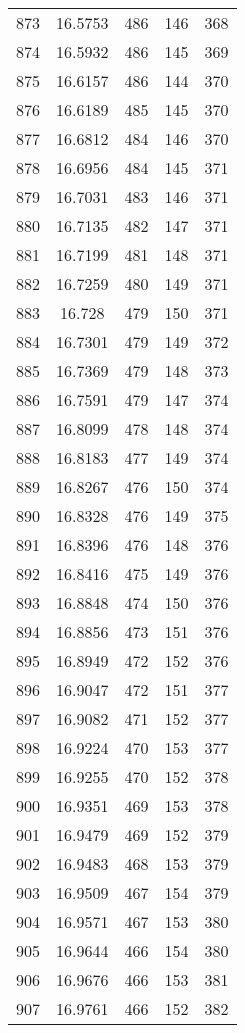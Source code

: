 \documentclass[12pt,a4paper]{article}
\begin{document}
\begin{tabular}{r|cccc}
	873 & 16.5753 & 486 & 146 & 368 \\
	874 & 16.5932 & 486 & 145 & 369 \\
	875 & 16.6157 & 486 & 144 & 370 \\
	876 & 16.6189 & 485 & 145 & 370 \\
	877 & 16.6812 & 484 & 146 & 370 \\
	878 & 16.6956 & 484 & 145 & 371 \\
	879 & 16.7031 & 483 & 146 & 371 \\
	880 & 16.7135 & 482 & 147 & 371 \\
	881 & 16.7199 & 481 & 148 & 371 \\
	882 & 16.7259 & 480 & 149 & 371 \\
	883 & 16.728 & 479 & 150 & 371 \\
	884 & 16.7301 & 479 & 149 & 372 \\
	885 & 16.7369 & 479 & 148 & 373 \\
	886 & 16.7591 & 479 & 147 & 374 \\
	887 & 16.8099 & 478 & 148 & 374 \\
	888 & 16.8183 & 477 & 149 & 374 \\
	889 & 16.8267 & 476 & 150 & 374 \\
	890 & 16.8328 & 476 & 149 & 375 \\
	891 & 16.8396 & 476 & 148 & 376 \\
	892 & 16.8416 & 475 & 149 & 376 \\
	893 & 16.8848 & 474 & 150 & 376 \\
	894 & 16.8856 & 473 & 151 & 376 \\
	895 & 16.8949 & 472 & 152 & 376 \\
	896 & 16.9047 & 472 & 151 & 377 \\
	897 & 16.9082 & 471 & 152 & 377 \\
	898 & 16.9224 & 470 & 153 & 377 \\
	899 & 16.9255 & 470 & 152 & 378 \\
	900 & 16.9351 & 469 & 153 & 378 \\
	901 & 16.9479 & 469 & 152 & 379 \\
	902 & 16.9483 & 468 & 153 & 379 \\
	903 & 16.9509 & 467 & 154 & 379 \\
	904 & 16.9571 & 467 & 153 & 380 \\
	905 & 16.9644 & 466 & 154 & 380 \\
	906 & 16.9676 & 466 & 153 & 381 \\
	907 & 16.9761 & 466 & 152 & 382 \\

\end{tabular}
\end{document}
